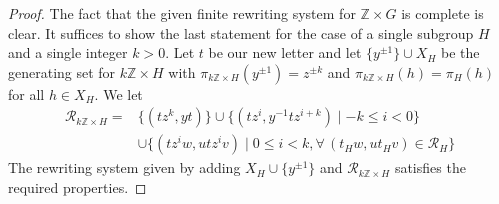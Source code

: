 \documentclass[10pt,a4paper]{amsart}
\newcommand{\Z}{\mathbb{Z}}
\begin{document}
\begin{proof}
The fact that the given finite rewriting system for $\Z\times G$ is complete is clear. It suffices to show the last statement for the case of a single subgroup $H$ and a single integer $k> 0$. Let $t$ be our new letter and let $\{y^{\pm1}\}\cup X_H$ be the generating set for $k\Z\times H$ with $\pi_{k\Z\times H}(y^{\pm1}) = z^{\pm k}$ and $\pi_{k\Z\times H}(h) = \pi_H(h)$ for all $h\in X_H$. We let
\begin{align*}
\mathcal{R}_{k\Z\times H} = &\{(tz^{k}, yt)\}\cup \{(tz^i, y^{-1}tz^{i+k}) \mid -k\leqslant i<0\}\\
						&\cup \{(tz^iw, utz^iv)\mid 0\leqslant i<k, \forall\, (t_Hw, ut_Hv)\in \mathcal{R}_H\}
\end{align*}
The rewriting system given by adding $X_H\cup\{y^{\pm1}\}$ and $\mathcal{R}_{k\Z\times H}$ satisfies the required properties.
\end{proof}
\end{document}
